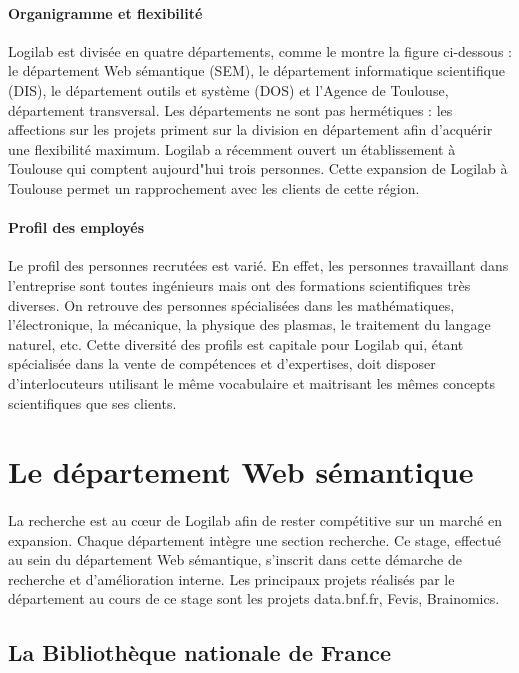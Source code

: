 \documentclass {report}
\begin{document}
\paragraph{Organigramme et flexibilité}
Logilab est divisée en quatre départements, comme le montre la figure ci-dessous : le département Web sémantique (SEM), le département informatique scientifique (DIS), le département outils et système (DOS) et l'Agence de Toulouse, département transversal. Les départements ne sont pas hermétiques : les affections sur les projets priment sur la division en département afin d'acquérir une flexibilité maximum. Logilab a récemment ouvert un établissement à Toulouse qui comptent aujourd"hui trois personnes. Cette expansion de Logilab à Toulouse permet un rapprochement avec les clients de cette région.

\paragraph{Profil des employés}
Le profil des personnes recrutées est varié. En effet, les personnes travaillant dans l’entreprise sont toutes ingénieurs mais ont des formations scientifiques très diverses. On retrouve des personnes spécialisées dans les mathématiques, l’électronique, la mécanique, la physique des plasmas, le traitement du langage naturel, etc. Cette diversité des profils est capitale pour Logilab qui, étant spécialisée dans la vente de compétences et d’expertises, doit disposer d’interlocuteurs utilisant le même vocabulaire et maitrisant les mêmes concepts scientifiques que ses clients. 



\section{Le département Web sémantique}
\paragraph{}
La recherche est au cœur de Logilab afin de rester compétitive sur un marché en expansion. Chaque département intègre une section recherche. Ce stage, effectué au sein du département Web sémantique, s'inscrit dans cette démarche de recherche et d'amélioration interne. Les principaux projets réalisés par le département au cours de ce stage sont les projets data.bnf.fr, Fevis, Brainomics.

\subsection{La Bibliothèque nationale de France}
\end{document}
